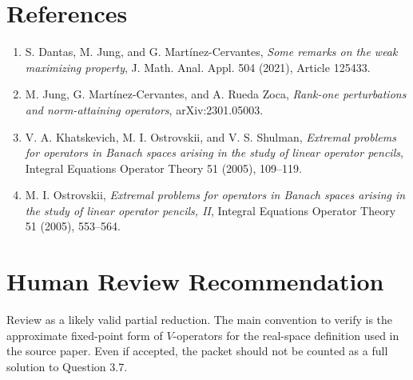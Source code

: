 \documentclass[11pt]{article}
\begin{document}
\section*{References}

\begin{enumerate}
\item S. Dantas, M. Jung, and G. Mart\'inez-Cervantes, \emph{Some remarks on
the weak maximizing property}, J. Math. Anal. Appl. 504 (2021), Article
125433.
\item M. Jung, G. Mart\'inez-Cervantes, and A. Rueda Zoca, \emph{Rank-one
perturbations and norm-attaining operators}, arXiv:2301.05003.
\item V. A. Khatskevich, M. I. Ostrovskii, and V. S. Shulman, \emph{Extremal
problems for operators in Banach spaces arising in the study of linear
operator pencils}, Integral Equations Operator Theory 51 (2005), 109--119.
\item M. I. Ostrovskii, \emph{Extremal problems for operators in Banach spaces
arising in the study of linear operator pencils, II}, Integral Equations
Operator Theory 51 (2005), 553--564.
\end{enumerate}

\section*{Human Review Recommendation}

Review as a likely valid partial reduction.  The main convention to verify is
the approximate fixed-point form of \(V\)-operators for the real-space
definition used in the source paper.  Even if accepted, the packet should not
be counted as a full solution to Question 3.7.
\end{document}
